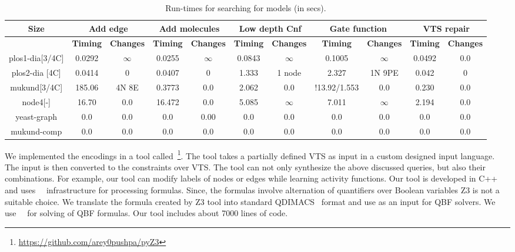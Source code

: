 \begin{table}[t]
  \centering
  \begin{tabular}[t]{|c@{}|@{}c@{}|@{}c@{}|@{}c@{}|@{}c@{}|@{}c@{}|@{}c@{}|@{}c@{}|@{}c@{}|@{}c@{}|@{}c@{}}\hline
    {\multirow{2}{*} \textbf{Size}}  & \multicolumn{2}{c|}{\textbf{Add edge}} & \multicolumn{2}{c|}{\textbf{Add molecules}} & \multicolumn{2}{c|}{\textbf{Low depth Cnf}}  &  \multicolumn{2}{c|}{\textbf{Gate function}} &  \multicolumn{2}{c|}{\textbf{VTS repair}} \\\hline
   
   \cline{2-9}
    {} & {\textbf{Timing}} & {\textbf{Changes}} & {\textbf{Timing}} & {\textbf{Changes}} & {\textbf{Timing}} & {\textbf{Changes}} & {\textbf{Timing}} & {\textbf{Changes}} & {\textbf{Timing}} & {\textbf{Changes}} \\\hline
    
    plos1-dia[3/4C] & 0.0292 & $\infty$ & 0.0255 & $\infty$ & 0.0843 & $\infty$ & 0.1005 & $\infty$ & 0.0492 & 0.0\\\hline
    plos2-dia [4C] & 0.0414 & 0 & 0.0407 & 0 & 1.333 & 1 node & 2.327 & 1N 9PE & 0.042 & 0 \\\hline
    mukund[3/4C] & 185.06 & 4N 8E & 0.3773 & 0.0 & 2.062 & 0.0 & !13.92/1.553 & 0.0 & 0.230 & 0.0 \\\hline
    node4[-] & 16.70 & 0.0 & 16.472 & 0.0 &  5.085 & $\infty$ & 7.011 & $\infty$ & 2.194 & 0.0\\\hline
    yeast-graph & 0.0 & 0.0 & 0.0 & 0.00 & 0.0 & 0.0 & 0.0  & 0.0 & 0.0 & 0.0 \\\hline
    mukund-comp & 0.0 & 0.0 & 0.0 & 0.0 & 0.0 & 0.0 & 0.0 & 0.0 & 0.0 & 0.0\\\hline
  \end{tabular}
  \caption{Run-times for searching for models (in secs).}
  \label{tab:qf-grabh}
\end{table}


We implemented the encodings in a tool
called~\ourtool\footnote{{\url{https://github.com/arey0pushpa/pyZ3}}}.
%
The tool takes a partially defined VTS as input in a custom designed
input language.
%
The input is then converted to the constraints over VTS. 
%
The tool can not only synthesize the above discussed queries, but also their
combinations.
%
For example, our tool can modify labels of nodes or edges while
learning activity functions.
%
Our tool is developed in C++ and uses~\zthree~\cite{z3} infrastructure for
processing formulas. 
%
Since, the formulas involve alternation of quantifiers over Boolean
variables Z3 is not a suitable choice.
%
We translate the formula created by Z3 tool into standard
QDIMACS~\cite{qdimacs} format and use as an input for QBF solvers. 
%
We use~\depqbf~\cite{lonsing2010depqbf} for solving of QBF formulas. 
%
Our tool includes about 7000 lines of code.

